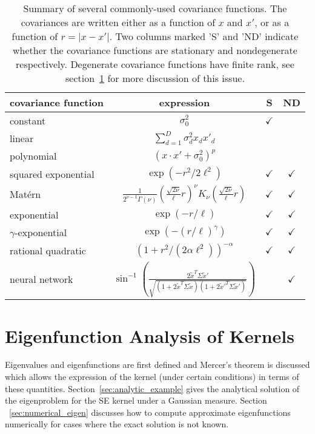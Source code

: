 \documentclass[11pt]{book}
\begin{document}
\begin{table}
\caption{Summary of several commonly-used covariance functions. The covariances are written either as a function of $x$ and $x'$, or as a function of $r = |x - x'|$. Two columns marked 'S' and 'ND' indicate whether the covariance functions are stationary and nondegenerate respectively. Degenerate covariance functions have finite rank, see section~\ref{sec:eigenfunction} for more discussion of this issue.}
\label{tab:covariance_summary}
\begin{center}
\begin{tabular}{lccc}
\hline
covariance function & expression & S & ND \\
\hline
constant & $\sigma_0^2$ & $\checkmark$ & \\
linear & $\sum_{d=1}^D \sigma_d^2 x_d x'_d$ & & \\
polynomial & $(x \cdot x' + \sigma_0^2)^p$ & & \\
squared exponential & $\exp(-r^2/2\ell^2)$ & $\checkmark$ & $\checkmark$ \\
Matérn & $\frac{1}{2^{\nu-1}\Gamma(\nu)} \left(\frac{\sqrt{2\nu}}{\ell}r\right)^\nu K_\nu\left(\frac{\sqrt{2\nu}}{\ell}r\right)$ & $\checkmark$ & $\checkmark$ \\
exponential & $\exp(-r/\ell)$ & $\checkmark$ & $\checkmark$ \\
$\gamma$-exponential & $\exp(-(r/\ell)^\gamma)$ & $\checkmark$ & $\checkmark$ \\
rational quadratic & $(1 + r^2/(2\alpha\ell^2))^{-\alpha}$ & $\checkmark$ & $\checkmark$ \\
neural network & $\sin^{-1}\left(\frac{2\tilde{x}^T\Sigma\tilde{x}'}{\sqrt{(1+2\tilde{x}^T\Sigma\tilde{x})(1+2\tilde{x}'^T\Sigma\tilde{x}')}}\right)$ & & $\checkmark$ \\
\hline
\end{tabular}
\end{center}
\end{table}

\section{Eigenfunction Analysis of Kernels}
\label{sec:eigenfunction}

Eigenvalues and eigenfunctions are first defined and Mercer's theorem is discussed which allows the expression of the kernel (under certain conditions) in terms of these quantities. Section~\ref{sec:analytic_example} gives the analytical solution of the eigenproblem for the SE kernel under a Gaussian measure. Section
~\ref{sec:numerical_eigen} discusses how to compute approximate eigenfunctions numerically for cases where the exact solution is not known.
\end{document}
